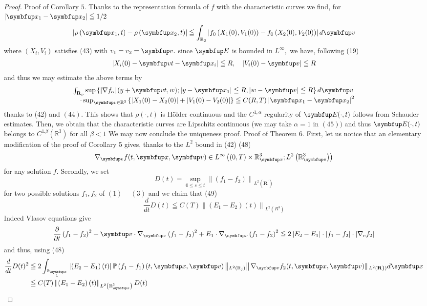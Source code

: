 \begin{proof}
  Proof of Corollary $5 .$ Thanks to the representation formula of $f$ with the characteristic curves we find, for $\left|\vx_{1}-\vx_{2}\right| \leqq 1 / 2$
\[
\left|\rho\left(\vx_{1}, t\right)-\rho\left(\vx_{2}, t\right)\right| \leqq \int_{\mathbb{R}_{2}}\left|f_{0}\left(X_{1}(0), V_{1}(0)\right)-f_{0}\left(X_{2}(0), V_{2}(0)\right)\right| d \vv
\]
where $\left(X_{i}, V_{i}\right)$ satisfies (43) with $v_{1}=v_{2}=\vv .$ since $\vE$ is bounded in $L^{\infty},$ we have, following (19)
\[
\left|X_{i}(0)-\vv t-\vx_{i}\right| \leqq R, \quad\left|V_{i}(0)-\vv\right| \leqq R
\]
and thus we may estimate the above terms by
\[
\begin{array}{l}
\int_{\mathbf{R}_{\mathrm{p}}} \sup \left\{\left|\nabla f_{\mathrm{o}}\right|(y+\vv t, w) ;\left|y-\vx_{1}\right| \leqq R,|w-\vv| \leqq R\right\} d \vv \\
\quad \cdot \sup _{\vv \in \mathbb{R}^{3}}\left\{\left|X_{1}(0)-X_{2}(0)\right|+\left|V_{1}(0)-V_{2}(0)\right|\right\} \leqq C(R, T)\left|\vx_{1}-\vx_{2}\right|^{2}
\end{array}
\]
thanks to (42) and $(44) .$ This shows that $\rho(\cdot, t)$ is Hölder continuous and the $C^{1, \alpha}$ regularity of $\vE(\cdot, t)$ follows from Schauder estimates. Then, we obtain that the characteristic curves are Lipschitz continuous (we may take $\alpha=1 \text { in }(45))$ and thus $\vE(\cdot, t)$ belongs to $C^{1 . \beta}\left(\mathbb{R}^{3}\right)$ for all $\beta<1$
We may now conclude the uniqueness proof.
Proof of Theorem $6 .$ First, let us notice that an clementary modification of the proof of Corollary 5 gives, thanks to the $L^{2}$ bound in (42)
(48)
\[
\nabla_{\vv} f(t, \vx, \vv) \in L^{\infty}\left((0, T) \times \mathbb{R}_{\vx}^{3} ; L^{2}\left(\mathbb{R}_{\vv}^{3}\right)\right)
\]
for any solution $f$. Secondly, we set
\[
D(t)=\sup _{0 \leq s \leq t}\left\|\left(f_{1}-f_{2}\right)\right\|_{L^{2}\left(\mathbf{R}^{\prime}\right)}
\]
for two possible solutions $f_{1}, f_{2}$ of $(1)-(3)$ and we claim that
(49)
\[
\frac{d}{d t} D(t) \leqq C(T)\left\|\left(E_{1}-E_{2}\right)(t)\right\|_{L^{2}\left(R^{3}\right)}
\]
Indeed Vlasov equations give
\[
\frac{\partial}{\partial t}\left(f_{1}-f_{2}\right)^{2}+\vv \cdot \nabla_{\vx}\left(f_{1}-f_{2}\right)^{2}+E_{1} \cdot \nabla_{\vv}\left(f_{1}-f_{2}\right)^{2} \leqq 2\left|E_{2}-E_{1}\right| \cdot\left|f_{1}-f_{2}\right| \cdot\left|\nabla_{e} f_{2}\right|
\]
and thus, using (48)
\[
\begin{aligned}
\frac{d}{d t} D(t)^{2} & \leqq 2 \int_{\mathbb{R}_{\vx} \atop 1}\left|\left(E_{2}-E_{1}\right)(t)\right| \mathbb{P}\left(f_{1}-f_{1}\right)(t, \vx, \vv)\left\|_{L^{2}\left(\mathbb{R}_{j}\right)}\right\| \nabla_{\vv} f_{2}(t, \vx, \vv) \|_{\left.L^{2}(\mathbf{R}\}\right)} d \vx \\
& \leqq C(T)\left\|\left(E_{1}-E_{2}\right)(t)\right\|_{L^{2}\left(\mathbb{R}_{\vx}^{3}\right)} D(t)
\end{aligned}
\]
\end{proof}


